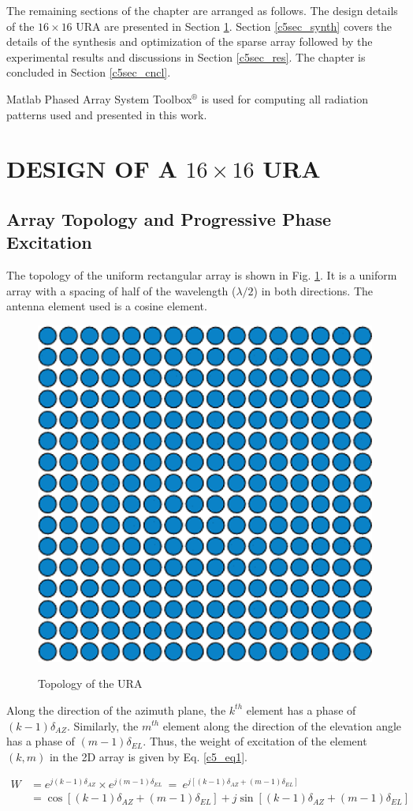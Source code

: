 The remaining sections of the chapter are arranged as follows. The design details of the $16\times16$ URA are presented in Section \ref{c5sec_design}. Section \ref{c5sec_synth} covers the details of the synthesis and optimization of the sparse array followed by the experimental results and discussions in Section \ref{c5sec_res}. The chapter is concluded in Section \ref{c5sec_cncl}.

Matlab Phased Array System Toolbox$^{\circledR}$ is used for computing all radiation patterns used and presented in this work.

\section{DESIGN OF A $16\times16$ URA}\label{c5sec_design}
\subsection{Array Topology and Progressive Phase Excitation}
The topology of the uniform rectangular array is shown in Fig. \ref{fig_5_1}. It is a uniform array with a spacing of half of the wavelength ($\lambda/2$) in both directions. The antenna element used is a cosine element.

\begin{figure}
  \centering
  \includegraphics[width=0.4\linewidth]{Fig-naun_1.eps}\\
  \caption{Topology of the URA} \label{fig_5_1}
\end{figure}

Along the direction of the azimuth plane, the $k^{th}$ element has a phase of $(k-1)\delta_{AZ}$. Similarly, the $m^{th}$ element along the direction of the elevation angle has a phase of $(m-1)\delta_{EL}$. Thus, the weight of excitation of the element $(k, m)$ in the 2D array is given by Eq. \ref{c5_eq1}.

\begin{equation}\label{c5_eq1}
\begin{split}
W & = e^{j(k-1)\delta_{AZ}} \times e^{j(m-1)\delta_{EL}}~=~e^{j[(k-1)\delta_{AZ} + (m-1)\delta_{EL}]} \\
  & = \cos[(k-1)\delta_{AZ} + (m-1)\delta_{EL}] + j\sin[(k-1)\delta_{AZ} + (m-1)\delta_{EL}]
\end{split}
\end{equation}

